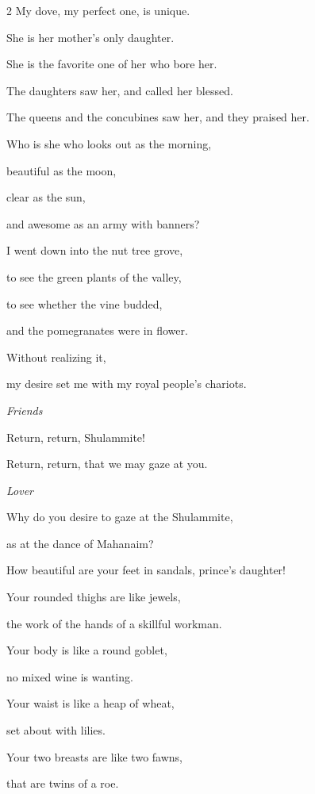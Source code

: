 \begin{multicols}{2}
\myverse{}My dove, my perfect one, is unique.

She is her mother’s only daughter.

She is the favorite one of her who bore her.

The daughters saw her, and called her blessed.

The queens and the concubines saw her, and they praised her.


\vspace{\baselineskip}

 \myverse{}Who is she who looks out as the morning,

beautiful as the moon,

clear as the sun,

and awesome as an army with banners?


\vspace{\baselineskip}

 \myverse{}I went down into the nut tree grove,

to see the green plants of the valley,

to see whether the vine budded,

and the pomegranates were in flower.

\myverse{}Without realizing it,

my desire set me with my royal people’s chariots.


\textit{Friends}

\myverse{}Return, return, Shulammite!

Return, return, that we may gaze at you.

\textit{Lover}

Why do you desire to gaze at the Shulammite,

as at the dance of Mahanaim?


\mychapter{} \myverse*{}How beautiful are your feet in sandals, prince’s daughter!

Your rounded thighs are like jewels,

the work of the hands of a skillful workman.

\myverse{}Your body is like a round goblet,

no mixed wine is wanting.

Your waist is like a heap of wheat,

set about with lilies.

\myverse{}Your two breasts are like two fawns,

that are twins of a roe.


\end{multicols}
